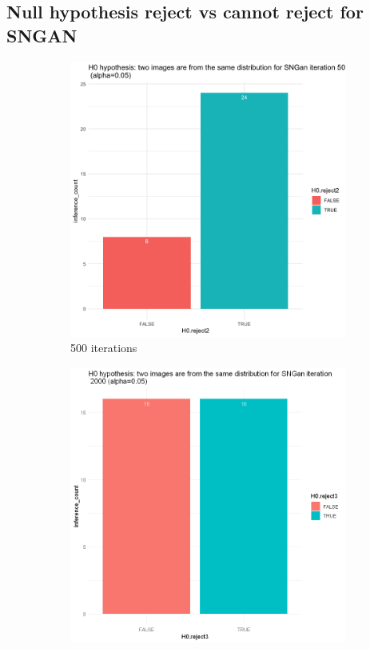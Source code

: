 \documentclass{article}
\begin{document}
\subsection*{Null hypothesis reject vs cannot reject for SNGAN}
\begin{figure}[h!]
    \caption{Dataset Flower}
     \centering
     \begin{subfigure}[b]{0.3\textwidth}
         \centering
         \includegraphics[width=\textwidth]{kmmd_figures/sngan_flower_500.png}
         \caption{500 iterations}
     \end{subfigure}
     \hfill
     \begin{subfigure}[b]{0.3\textwidth}
         \centering
         \includegraphics[width=\textwidth]{kmmd_figures/sngan_flower_2000.png}

\end{subfigure}
\end{figure}
\end{document}
